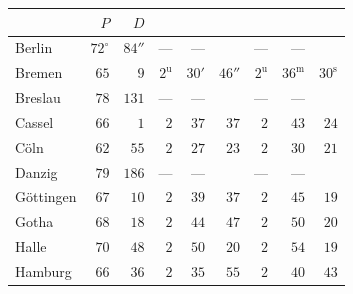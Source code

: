 \begin{center}\small\setlength{\tabcolsep}{3pt}
\begin{tabular}{l|r|r|rrr|rrr}
 &  $P$  &  $D$  &    &    \\
\hline
Berlin  &  $72^\circ$  &  $84''$  &  ---  &  ---  &   &  ---  &  ---  &   \\
Bremen  &  $65$  &  $9$  &  $2^{\mathrm u}$  &  $30'$  &  $46''$  &  $2^{\mathrm u}$  &  $36^{\mathrm m}$  &  $30^{\mathrm s}$  \\
Breslau  &  $78$  &  $131$  &  ---  &  ---  &   &  ---  &  ---  &   \\
Cassel  &  $66$  &  $1$  &  $2$  &  $37$  &  $37$  &  $2$  &  $43$  &  $24$  \\
Cöln  &  $62$  &  $55$  &  $2$  &  $27$  &  $23$  &  $2$  &  $30$  &  $21$  \\
Danzig  &  $79$  &  $186$  &  ---  &  ---  &   &  ---  &  ---  &   \\
Göttingen  &  $67$  &  $10$  &  $2$  &  $39$  &  $37$  &  $2$  &  $45$  &  $19$  \\
Gotha  &  $68$  &  $18$  &  $2$  &  $44$  &  $47$  &  $2$  &  $50$  &  $20$  \\
Halle  &  $70$  &  $48$  &  $2$  &  $50$  &  $20$  &  $2$  &  $54$  &  $19$  \\
Hamburg  &  $66$  &  $36$  &  $2$  &  $35$  &  $55$  &  $2$  &  $40$  &  $43$  \\
\end{tabular}
\end{center}

